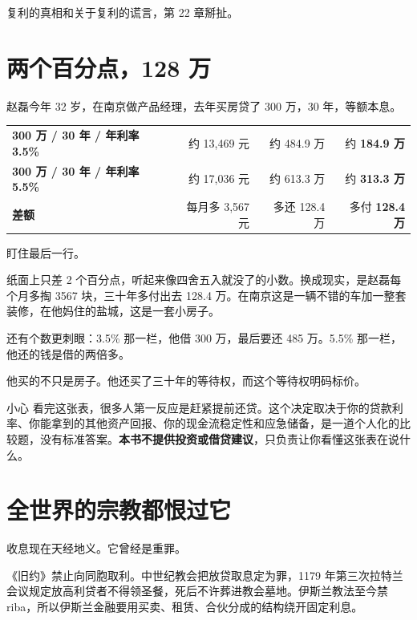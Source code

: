 复利的真相和关于复利的谎言，第 22 章掰扯。

\section{两个百分点，128 万}

赵磊今年 32 岁，在南京做产品经理，去年买房贷了 300 万，30 年，等额本息。

\begin{tablewrap}
\begin{xltabular}{\linewidth}{Xrrr}
\toprule
{} &  &  &  \\
\midrule
\textbf{300 万 / 30 年 / 年利率 \textbf{3.5\%}} & 约 13,469 元 & 约 484.9 万 & 约 \textbf{184.9 万} \\
\textbf{300 万 / 30 年 / 年利率 \textbf{5.5\%}} & 约 17,036 元 & 约 613.3 万 & 约 \textbf{313.3 万} \\
\textbf{差额} & 每月多 3,567 元 & 多还 128.4 万 & 多付 \textbf{128.4 万} \\
\bottomrule
\end{xltabular}
\end{tablewrap}

盯住最后一行。

纸面上只差 2 个百分点，听起来像四舍五入就没了的小数。换成现实，是赵磊每个月多掏 3567 块，三十年多付出去 128.4 万。在南京这是一辆不错的车加一整套装修，在他妈住的盐城，这是一套小房子。

还有个数更刺眼：3.5\% 那一栏，他借 300 万，最后要还 485 万。5.5\% 那一栏，他还的钱是借的两倍多。

他买的不只是房子。他还买了三十年的等待权，而这个等待权明码标价。

\begin{warnbox}{小心}
看完这张表，很多人第一反应是赶紧提前还贷。这个决定取决于你的贷款利率、你能拿到的其他资产回报、你的现金流稳定性和应急储备，是一道个人化的比较题，没有标准答案。\textbf{本书不提供投资或借贷建议}，只负责让你看懂这张表在说什么。

\end{warnbox}

\section{全世界的宗教都恨过它}

收息现在天经地义。它曾经是重罪。

《旧约》禁止向同胞取利。中世纪教会把放贷取息定为罪，1179 年第三次拉特兰会议规定放高利贷者不得领圣餐，死后不许葬进教会墓地。伊斯兰教法至今禁 riba，所以伊斯兰金融要用买卖、租赁、合伙分成的结构绕开固定利息。

